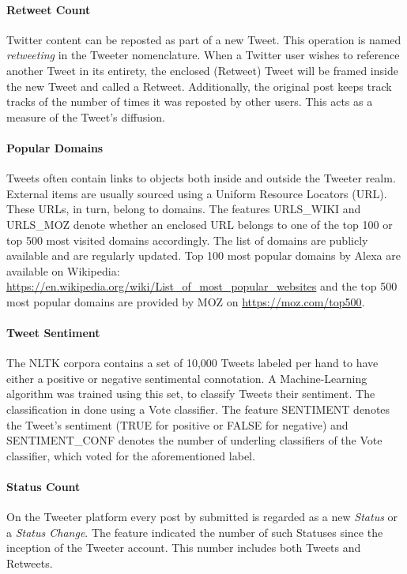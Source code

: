 			\paragraph{Retweet Count}
				Twitter content can be reposted as part of a new Tweet. This operation is named \textit{retweeting} in the Tweeter nomenclature. When a Twitter user wishes to reference another Tweet in its entirety, the enclosed (Retweet) Tweet will be framed inside the new Tweet and called a Retweet. Additionally, the original post keeps track tracks of the number of times it was reposted by other users. This acts as a measure of the Tweet's diffusion.
				
			\paragraph{Popular Domains}
				Tweets often contain links to objects both inside and outside the Tweeter realm. External items are usually sourced using a Uniform Resource Locators (URL). These URLs, in turn, belong to domains. The features URLS\_WIKI and URLS\_MOZ denote whether an enclosed URL belongs to one of the top 100 or top 500 most visited domains accordingly. The list of domains are publicly available and are regularly updated. Top 100 most popular domains by Alexa are available on Wikipedia: \url{https://en.wikipedia.org/wiki/List_of_most_popular_websites} and the top 500 most popular domains are provided by MOZ on \url{https://moz.com/top500}.
			
			\paragraph{Tweet Sentiment}
				The NLTK corpora contains a set of 10,000 Tweets labeled per hand to have either a positive or negative sentimental connotation. A Machine-Learning algorithm was trained using this set, to classify Tweets their sentiment. The classification in done using a Vote classifier. The feature SENTIMENT denotes the Tweet's sentiment (TRUE for positive or FALSE for negative) and SENTIMENT\_CONF denotes the number of underling classifiers of the Vote classifier, which voted for the aforementioned label.
				
			\paragraph{Status Count}
				On the Tweeter platform every post by submitted is regarded as a new \textit{Status} or a \textit{Status Change}. The feature indicated the number of such Statuses since the inception of the Tweeter account. This number includes both Tweets and Retweets.
			
